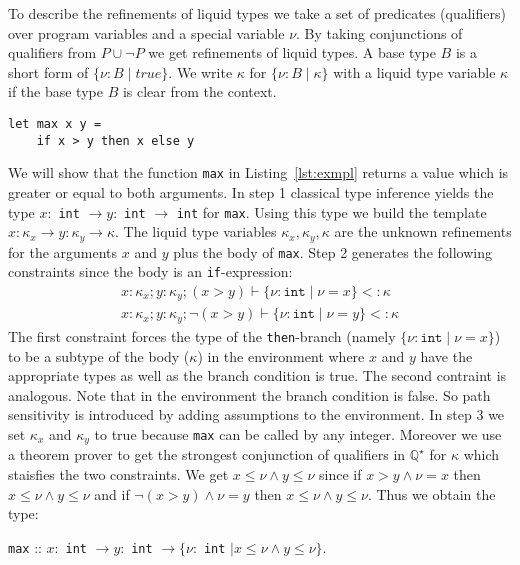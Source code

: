 \documentclass[a4paper,UKenglish]{lipics-v2016}
\begin{document}
To describe the refinements of liquid types we take a set of predicates (qualifiers) over program variables and a special variable $\nu$.
By taking conjunctions of qualifiers from $P \cup \neg P$ we get refinements of liquid types.
A base type $B$ is a short form of $\{\nu: B \mid true\}$.
We write $\kappa$ for $\{\nu: B \mid \kappa\}$ with a liquid type variable $\kappa$ if the base type $B$ is clear from the context.

\begin{lstlisting}[caption={Example Program},label=lst:exmpl,captionpos=t,float,abovecaptionskip=-\medskipamount]
let max x y =
    if x > y then x else y
\end{lstlisting}

We will show that the function \lstinline{max} in Listing~\ref{lst:exmpl} returns a value which is greater or equal to both arguments.
In step 1 classical type inference yields the type $x:$ \lstinline{int} $\rightarrow y:$ \lstinline{int} $\rightarrow$ \lstinline{int} for \lstinline{max}.
Using this type we build the template $x: \kappa_x \rightarrow y: \kappa_y \rightarrow \kappa$.
The liquid type variables $\kappa_x, \kappa_y, \kappa$ are the unknown refinements for the arguments $x$ and $y$ plus the body of \lstinline{max}.
Step 2 generates the following constraints since the body is an \lstinline{if}-expression:
\begin{align}
    \label{algn:max}
    x: \kappa_x; y: \kappa_y; (x > y) \vdash \{\nu: \texttt{int} \mid \nu = x \} <: \kappa\\
    x: \kappa_x; y: \kappa_y; \neg(x > y) \vdash \{\nu: \texttt{int} \mid \nu = y \} <: \kappa
\end{align}
The first constraint forces the type of the \lstinline{then}-branch (namely $\{\nu: \texttt{int} \mid \nu = x \}$) to be a subtype
of the body ($\kappa$) in the environment where $x$ and $y$ have the appropriate types as well as the branch condition is true.
The second contraint is analogous.
Note that in the environment the branch condition is false.
So path sensitivity is introduced by adding assumptions to the environment.
In step 3 we set $\kappa_x$ and $\kappa_y$ to true because \lstinline{max} can be called by any integer.
Moreover we use a theorem prover to get the strongest conjunction of qualifiers in $\mathbb{Q}^\star$ for $\kappa$ which staisfies the two constraints.
We get $x \le \nu \land y \le \nu$ since if $x > y \land \nu = x$ then $x \le \nu \land y \le \nu$ and if $\neg(x > y) \land \nu = y$
then $x \le \nu \land y \le \nu$.
Thus we obtain the type:
\begin{center}
    \lstinline{max} :: $x:$ \lstinline{int} $\rightarrow y:$ \lstinline{int} $\rightarrow \{\nu:$ \lstinline{int} $\mid x \le \nu \land y \le \nu\}$.
\end{center}
\end{document}
